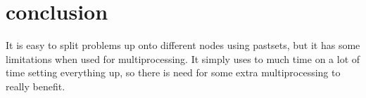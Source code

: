 \documentclass{Article}
\begin{document}
\section{conclusion}
It is easy to split problems up onto different nodes using pastsets, but it has some limitations when used for multiprocessing. It simply uses to much time on a lot of time setting everything up, so there is need for some extra multiprocessing to really benefit.
\end{document}

